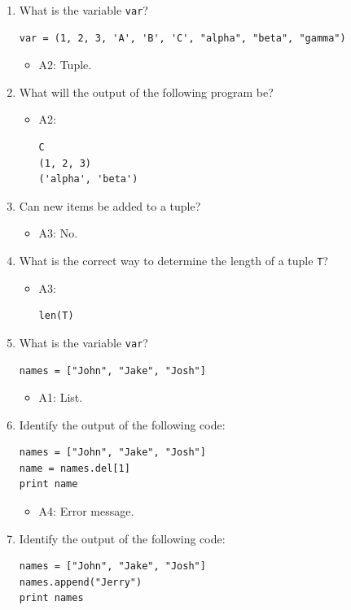 \documentclass[article,A4,12pt]{llncs}
\begin{document}
\begin{enumerate}
\item What is the variable {\tt var}?
\begin{verbatim}
var = (1, 2, 3, 'A', 'B', 'C', "alpha", "beta", "gamma")
\end{verbatim}
  \begin{itemize}
    \item A2: Tuple.
  \end{itemize}
\item What will the output of the following program be?
  \begin{itemize}
    \item A2:
\begin{verbatim}
C
(1, 2, 3)
('alpha', 'beta')
\end{verbatim}
  \end{itemize}
\item Can new items be added to a tuple?
  \begin{itemize}
    \item A3: No.
  \end{itemize}
\item What is the correct way to determine the length of a tuple {\tt T}?
  \begin{itemize}
    \item A3:
\begin{verbatim}
len(T)
\end{verbatim}
  \end{itemize}
\item What is the variable {\tt var}?
\begin{verbatim}
names = ["John", "Jake", "Josh"]
\end{verbatim}
  \begin{itemize}
    \item A1: List.
  \end{itemize}
\item Identify the output of the following code:
\begin{verbatim}
names = ["John", "Jake", "Josh"]
name = names.del[1]
print name
\end{verbatim}
  \begin{itemize}
    \item A4: Error message.
  \end{itemize}
\item Identify the output of the following code:
\begin{verbatim}
names = ["John", "Jake", "Josh"]
names.append("Jerry")
print names
\end{verbatim}

\end{enumerate}
\end{document}
